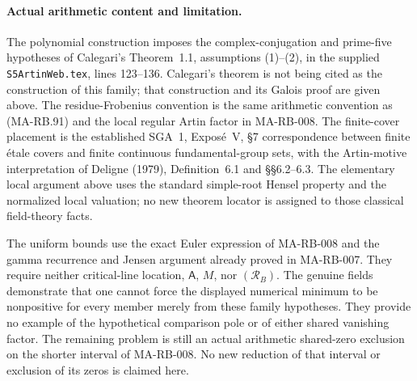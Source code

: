 \paragraph{Actual arithmetic content and limitation.}
The polynomial construction imposes the complex-conjugation
and prime-five hypotheses of Calegari's Theorem~1.1,
assumptions (1)--(2), in the supplied
\texttt{S5ArtinWeb.tex}, lines 123--136.
Calegari's theorem is not being cited as the construction
of this family; that construction and its Galois proof
are given above.
The residue-Frobenius convention is the same arithmetic
convention as (MA-RB.91) and the local regular Artin
factor in MA-RB-008.
The finite-cover placement is the established SGA~1,
Expos\'e~V, \S7 correspondence between finite \'etale
covers and finite continuous fundamental-group sets,
with the Artin-motive interpretation of Deligne (1979),
Definition~6.1 and \S\S6.2--6.3.
The elementary local argument above uses the standard
simple-root Hensel property and the normalized local
valuation; no new theorem locator is assigned to those
classical field-theory facts.

The uniform bounds use the exact Euler expression of
MA-RB-008 and the gamma recurrence and Jensen argument
already proved in MA-RB-007. They require neither
critical-line location, \(\mathsf A\), \(M\), nor
\((\mathcal R_B)\).
The genuine fields demonstrate that one cannot force
the displayed numerical minimum to be nonpositive
for every member merely from these family hypotheses.
They provide no example of the hypothetical comparison
pole or of either shared vanishing factor.
The remaining problem is still an actual arithmetic
shared-zero exclusion on the shorter interval of
MA-RB-008. No new reduction of that interval or
exclusion of its zeros is claimed here.
